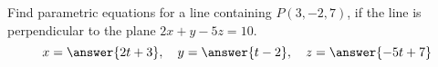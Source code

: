\documentclass{ximera}
\author{}
\begin{document}
\begin{exercise}
Find parametric equations for a line containing $P(3, -2, 7)$, if the line is perpendicular to the plane $2x+y-5z=10$.
$$x=\answer{2t+3},\quad y=\answer{t-2},\quad z=\answer{-5t+7}$$
 
\end{exercise}
\end{document}
